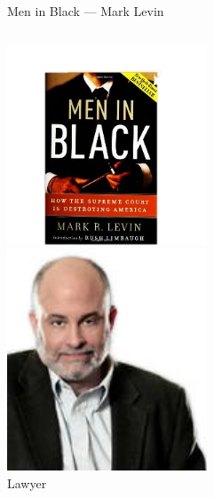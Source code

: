 \begin{frame}{Men in Black --- Mark Levin}
    \begin{columns}[onlytextwidth]
            \centering
            \includegraphics[width=0.75\textwidth]{img/men-in-black.png} \\

            \centering
            \includegraphics[width=0.75\textwidth]{img/mark-levin.png} \\
            Lawyer \\
    \end{columns}
\end{frame}

